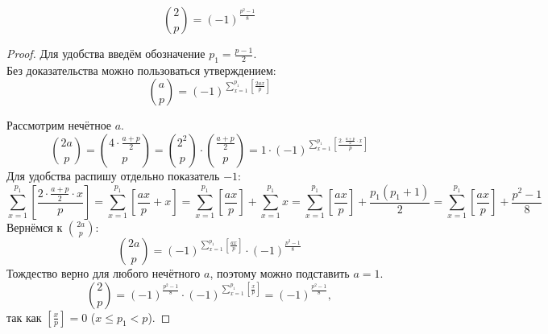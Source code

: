 \begin{theorem}
    $$
        \binom{2}{p} = (-1)^{\frac{p^2 - 1}{8}}
    $$
    \begin{proof}
        Для удобства введём обозначение $p_1 = \frac{p - 1}{2}$.\\
        
        Без доказательства можно пользоваться утверждением:\\
        $$
            \binom{a}{p} = (-1)^{ \sum \limits_{x=1}^{ p_1 } \left[ \frac{2ax}{p} \right] }
        $$
        
        Рассмотрим нечётное $a$.\\
        $$
            \binom{2a}{p} = \binom{4 \cdot \frac{a + p}{2}}{p} = \binom{2^2}{p} \cdot \binom{ \frac{a + p}{2} }{p} = 1 \cdot (-1) ^ {\sum \limits_{x=1}^{ p_1 } \left[ \frac{2 \cdot \frac{a + p}{2} \cdot x}{p} \right] }
        $$
        Для удобства распишу отдельно показатель $-1$:\\
        $$
            \sum \limits_{x=1}^{ p_1 } \left[ \frac{2 \cdot \frac{a + p}{2} \cdot x}{p} \right] = \sum \limits_{x=1}^{p_1} \left[ \frac{ax}{p} + x \right] = \sum \limits_{x=1}^{p_1} \left[ \frac{ax}{p} \right] + \sum \limits_{x=1}^{p_1} x = \sum \limits_{x=1}^{p_1} \left[ \frac{ax}{p} \right] + \frac{p_1(p_1 + 1)}{2} = \sum \limits_{x=1}^{p_1} \left[ \frac{ax}{p} \right] + \frac{p^2 - 1}{8}
        $$
        Вернёмся к $\binom{2a}{p}$:
        $$
            \binom{2a}{p} = (-1)^{ \sum \limits_{x=1}^{p_1} \left[ \frac{ax}{p} \right] } \cdot (-1)^{ \frac{p^2 - 1}{8} }
        $$
        Тождество верно для любого нечётного $a$, поэтому можно подставить $a = 1$.
        $$
            \binom{2}{p} = (-1)^{ \frac{p^2 - 1}{8} } \cdot (-1)^{ \sum \limits_{x=1}^{p_1} \left[ \frac{x}{p} \right] } = (-1)^{ \frac{p^2 - 1}{8} },
        $$
        так как $\left[ \frac{x}{p} \right] = 0$ ($x \leq p_1 < p$).
    \end{proof}
\end{theorem}